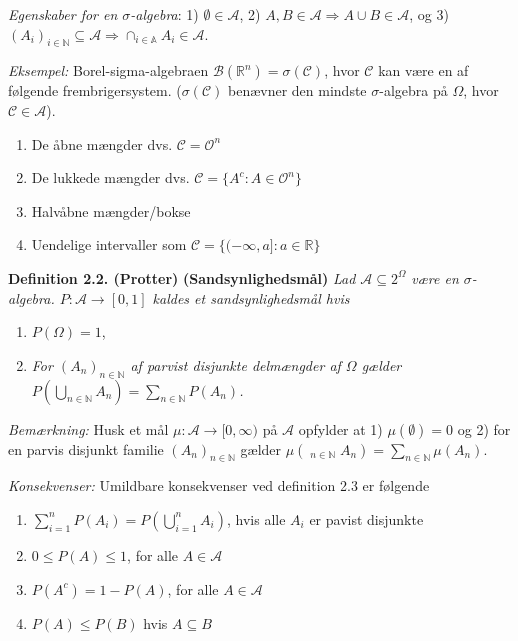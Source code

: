 \documentclass[
]{book}
\providecommand{\tightlist}{%
  \setlength{\itemsep}{0pt}\setlength{\parskip}{0pt}}
\begin{document}
\emph{Egenskaber for en \(\sigma\)-algebra}: 1) \(\emptyset\in\mathcal{A}\), 2) \(A,B\in\mathcal{A}\Rightarrow A \cup B\in\mathcal{A}\), og 3) \((A_i)_{i\in\mathbb{N}}\subseteq\mathcal{A}\Rightarrow\cap_{i\in\mathbb{A}}A_i\in\mathcal{A}\).

\emph{Eksempel:} Borel-sigma-algebraen \(\mathcal{B}(\mathbb{R}^n)=\sigma(\mathcal{C})\), hvor \(\mathcal{C}\) kan være en af følgende frembrigersystem. (\(\sigma(\mathcal{C})\) benævner den mindste \(\sigma\)-algebra på \(\Omega\), hvor \(\mathcal{C}\in\mathcal{A}\)).

\begin{enumerate}
\def\labelenumi{\roman{enumi}.}
\tightlist
\item
  De åbne mængder dvs. \(\mathcal{C}=\mathcal{O}^n\)
\item
  De lukkede mængder dvs. \(\mathcal{C}=\{A^c : A\in\mathcal{O}^n\}\)
\item
  Halvåbne mængder/bokse
\item
  Uendelige intervaller som \(\mathcal{C}=\{(-\infty,a] : a\in\mathbb{R}\}\)
\end{enumerate}

\textbf{Definition 2.2. (Protter)} \textbf{(Sandsynlighedsmål)} \emph{Lad \(\mathcal{A}\subseteq2^\Omega\) være en \(\sigma\)-algebra. \(P : \mathcal{A}\to[0,1]\) kaldes et sandsynlighedsmål hvis}

\begin{enumerate}
\def\labelenumi{\arabic{enumi}.}
\tightlist
\item
  \(P(\Omega)=1\),
\item
  \emph{For \((A_n)_{n\in\mathbb{N}}\) af parvist disjunkte delmængder af \(\Omega\) gælder \(P\left(\bigcup_{n\in\mathbb{N}}A_n\right)=\sum_{n\in\mathbb{N}}P(A_n)\).}
\end{enumerate}

\emph{Bemærkning:} Husk et mål \(\mu : \mathcal{A}\to [0,\infty)\) på \(\mathcal{A}\) opfylder at 1) \(\mu(\emptyset)=0\) og 2) for en parvis disjunkt familie \((A_n)_{n\in\mathbb{N}}\) gælder \(\mu\left(\mathop{\dot{\bigcup}}_{n\in\mathbb{N}}A_n\right)=\sum_{n\in\mathbb{N}}\mu(A_n)\).

\emph{Konsekvenser:} Umildbare konsekvenser ved definition 2.3 er følgende

\begin{enumerate}
\def\labelenumi{\roman{enumi}.}
\tightlist
\item
  \(\sum_{i=1}^n P(A_i)=P\left(\bigcup_{i=1}^nA_i\right)\), hvis alle \(A_i\) er pavist disjunkte
\item
  \(0\le P(A)\le 1\), for alle \(A\in\mathcal{A}\)
\item
  \(P(A^c)=1-P(A)\), for alle \(A\in\mathcal{A}\)
\item
  \(P(A)\le P(B)\) hvis \(A\subseteq B\)
\end{enumerate}
\end{document}
